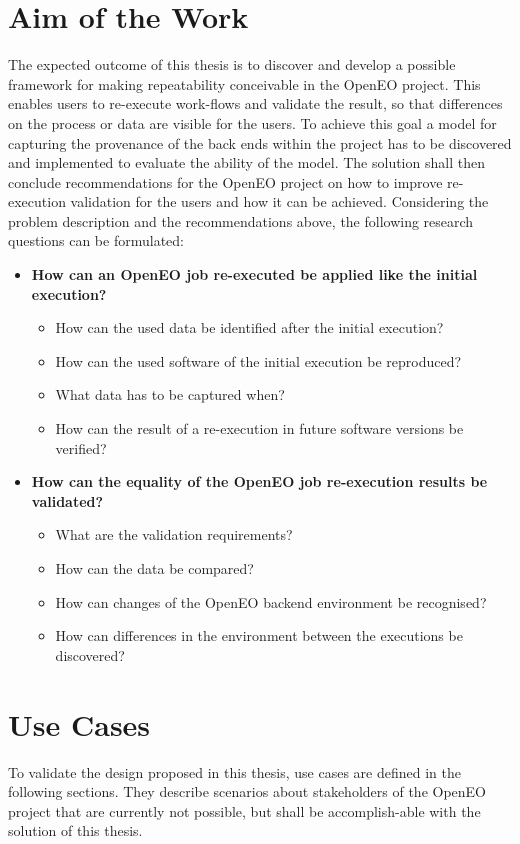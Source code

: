 \documentclass[draft,final]{vutinfth} %
\begin{document}
\section{Aim of the Work}\label{Aim}

The expected outcome of this thesis is to discover and develop a possible framework for making repeatability conceivable in the OpenEO project. This enables users to re-execute work-flows and validate the result, so that differences on the process or data are visible for the users. To achieve this goal a model for capturing the provenance of the back ends within the project has to be discovered and implemented to evaluate the ability of the model. The solution shall then conclude recommendations for the OpenEO project on how to improve re-execution validation for the users and how it can be achieved. Considering the problem description and the recommendations above, the following research questions can be formulated:

\begin{itemize}
	\item \textbf{How can an OpenEO job re-executed be applied like the initial execution?}
	\begin{itemize}
		\item How can the used data be identified after the initial execution?
		\item How can the used software of the initial execution be reproduced?
		\item What data has to be captured when?
		\item How can the result of a re-execution in future software versions be verified?
	\end{itemize}
	\item \textbf{How can the equality of the OpenEO job re-execution results be validated?}
	\begin{itemize}
		\item What are the validation requirements?
		\item How can the data be compared?
		\item How can changes of the OpenEO backend environment be recognised?
		\item How can differences in the environment between the executions be discovered?
	\end{itemize}
\end{itemize}

\section{Use Cases}\label{Use Cases}
To validate the design proposed in this thesis, use cases are defined in the following sections. They describe scenarios about stakeholders of the OpenEO project that are currently not possible, but shall be accomplish-able with the solution of this thesis.
    
\end{document}
